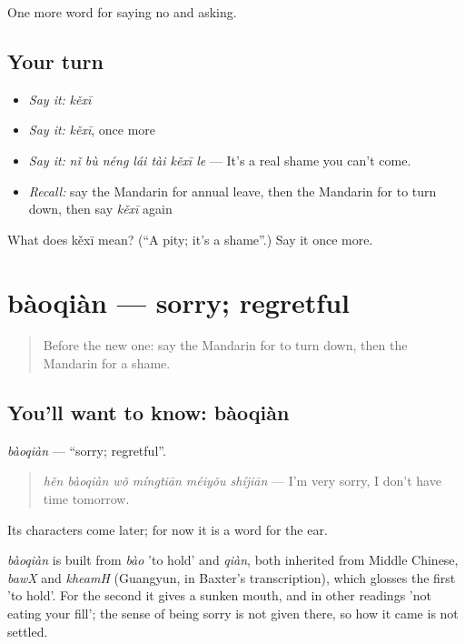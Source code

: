 \begin{grammarlens}[title={What you've built}]
One more word for saying no and asking.
\end{grammarlens}

\subsection*{Your turn}
\begin{itemize}
\raggedright
  \item \emph{Say it:} \emph{kěxī}
  \item \emph{Say it:} \emph{kěxī}, once more
  \item \emph{Say it:} \emph{nǐ bù néng lái tài kěxī le} — It's a real shame you can't come.
  \item \emph{Recall:} say the Mandarin for annual leave, then the Mandarin for to turn down, then say \emph{kěxī} again
\end{itemize}

\begin{tcolorbox}[breakable,colback=teal!4,colframe=teal!35!black,title={Before you move on}]
What does kěxī mean? (\textquotedblleft{}A pity; it's a shame\textquotedblright{}.) Say it once more.
\end{tcolorbox}
\section[bàoqiàn]{bàoqiàn — sorry; regretful}

\label{lesson:ZH-C264-baoqian}



\begin{quote}
Before the new one: say the Mandarin for to turn down, then the Mandarin for a shame.
\end{quote}

\subsection*{You'll want to know: bàoqiàn}
\emph{bàoqiàn} — \textquotedblleft{}sorry; regretful\textquotedblright{}.

\begin{quote}
\emph{hěn bàoqiàn wǒ míngtiān méiyǒu shíjiān} — I'm very sorry, I don't have time tomorrow.
\end{quote}

Its characters come later; for now it is a word for the ear.

\begin{cousinweb}
\emph{bàoqiàn} is built from \emph{bào} 'to hold' and \emph{qiàn}, both inherited from Middle Chinese, \emph{bawX} and \emph{kheamH} (Guangyun, in Baxter's transcription), which glosses the first 'to hold'. For the second it gives a sunken mouth, and in other readings 'not eating your fill'; the sense of being sorry is not given there, so how it came is not settled.
\end{cousinweb}

